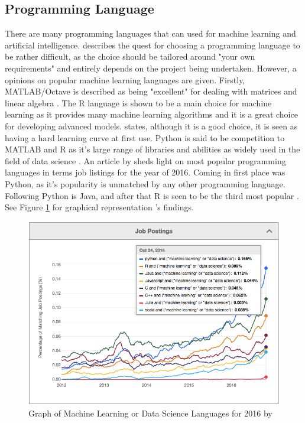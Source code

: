 \subsection{Programming Language}
There are many programming languages that can used for machine learning and artificial intelligence. \citeauthor{brownlee} describes the quest for choosing a programming language to be rather difficult, as the choice should be tailored around "your own requirements" and entirely depends on the project being undertaken. However, a opinions on popular machine learning languages are given. Firstly, MATLAB/Octave is described as being "excellent" for dealing with matrices and linear algebra \citep{brownlee}. The R language is shown to be a main choice for machine learning as it provides many machine learning algorithms and it is a great choice for developing advanced models. \citeauthor{brownlee} states, although it is a good choice, it is seen as having a hard learning curve at first use. Python is said to be competition to MATLAB and R as it's large range of libraries and abilities as widely used in the field of data science \citep{brownlee}.
An article by \citeauthor{verma_2017} sheds light on most popular programming languages in terms job listings for the year of 2016. Coming in first place was Python, as it's popularity is unmatched by any other programming language. Following Python is Java, and after that R is seen to be the third most popular \citep{verma_2017}. See Figure \ref{verma} for graphical representation \citeauthor{verma_2017}'s findings.

\begin{figure}[ht]
	\begin{center}
		\advance\leftskip-3cm
		\advance\rightskip-3cm
		\includegraphics[keepaspectratio=true,scale=0.6]{__resources/research/top_lang.jpg}
		\caption{Graph of Machine Learning or Data Science Languages for 2016 by \cite{verma_2017}}
		\label{verma}
	\end{center}
\end{figure}

